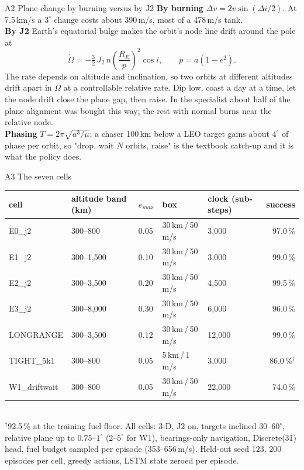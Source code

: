 \documentclass[aspectratio=169,11pt]{beamer}
\newcommand{\dv}{\ensuremath{\Delta v}}
\newcommand{\boxR}{30\,km}
\newcommand{\boxV}{50\,m/s}
\begin{document}
\begin{frame}{A2 \; Plane change by burning versus by J2}
\small
\textbf{By burning} \; $\dv = 2v\sin(\Delta i/2)$. At 7.5\,km/s a $3^\circ$ change costs about 390\,m/s, most of a 478\,m/s tank.\\[2mm]
\textbf{By J2} \; Earth's equatorial bulge makes the orbit's node line drift around the pole at
\[ \dot\Omega = -\tfrac32\, J_2\, n \left(\frac{R_E}{p}\right)^{2} \cos i, \qquad p = a(1-e^2). \]
The rate depends on altitude and inclination, so two orbits at different altitudes drift apart in $\Omega$ at a controllable relative rate. Dip low, coast a day at a time, let the node drift close the plane gap, then raise. In the specialist about half of the plane alignment was bought this way; the rest with normal burns near the relative node.\\[2mm]
\textbf{Phasing} \; $T = 2\pi\sqrt{a^3/\mu}$; a chaser 100\,km below a LEO target gains about $4^\circ$ of phase per orbit, so "drop, wait $N$ orbits, raise" is the textbook catch-up and it is what the policy does.
\end{frame}

\begin{frame}{A3 \; The seven cells}
\scriptsize
\begin{tabular}{@{}lllllr@{}}
\toprule
cell & altitude band (km) & $e_{max}$ & box & clock (sub-steps) & success\\
\midrule
E0\_j2 & 300--800 & 0.05 & \boxR\,/\,\boxV & 3,000 & 97.0\,\%\\
E1\_j2 & 300--1,500 & 0.10 & \boxR\,/\,\boxV & 3,000 & 99.0\,\%\\
E2\_j2 & 300--3,500 & 0.20 & \boxR\,/\,\boxV & 4,500 & 99.5\,\%\\
E3\_j2 & 300--8,000 & 0.30 & \boxR\,/\,\boxV & 6,000 & 96.0\,\%\\
LONGRANGE & 300--3,500 & 0.12 & \boxR\,/\,\boxV & 12,000 & 99.0\,\%\\
TIGHT\_5k1 & 300--800 & 0.05 & 5\,km\,/\,1\,m/s & 3,000 & 86.0\,\%$^\dagger$\\
W1\_driftwait & 300--800 & 0.05 & \boxR\,/\,\boxV & 22,000 & 74.0\,\%\\
\bottomrule
\end{tabular}
\\[2mm]
$^\dagger$92.5\,\% at the training fuel floor. All cells: 3-D, J2 on, targets inclined $30$--$60^\circ$, relative plane up to $0.75$--$1^\circ$ ($2$--$5^\circ$ for W1), bearings-only navigation, Discrete(31) head, fuel budget sampled per episode (353--656\,m/s). Held-out seed 123, 200 episodes per cell, greedy actions, LSTM state zeroed per episode.
\end{frame}
\end{document}
